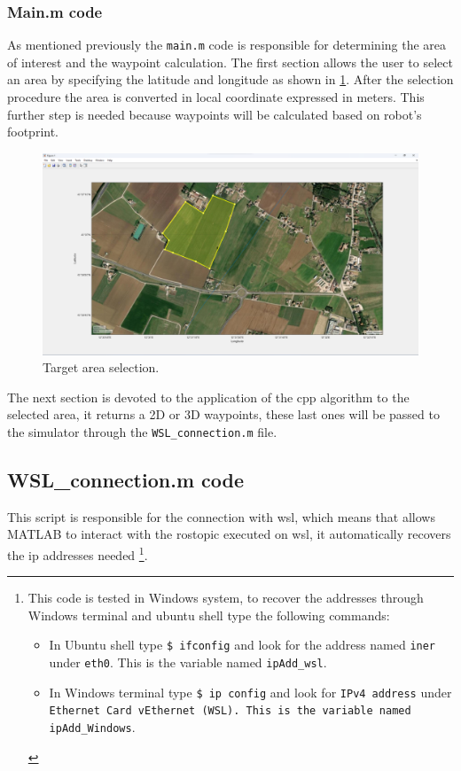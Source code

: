 \subsubsection*{Main.m code}
As mentioned previously the \texttt{main.m} code is responsible for determining the area of interest and the waypoint calculation.
The first section allows the user to select an area by specifying the latitude and longitude as shown in \ref{fig:target_area_selection}. After the selection procedure the area is converted in local coordinate expressed in meters. This further step is needed because waypoints will be calculated based on robot's footprint.

\begin{figure}[hbt!]
	\centering
	\includegraphics[width=\linewidth]{images/target_area_selection}
	\caption{Target area selection.}
	\label{fig:target_area_selection}
\end{figure}

The next section is devoted to the application of the \ac{cpp} algorithm to the selected area, it returns a 2D or 3D waypoints, these last ones will be passed to the simulator through the \texttt{WSL\_connection.m} file.


\subsection*{WSL\_connection.m code}
This script is responsible for the connection with \ac{wsl}, which means that allows MATLAB to interact with the rostopic executed on \ac{wsl}, it automatically recovers the ip addresses needed
\footnote{This code is tested in Windows system, to recover the addresses through Windows terminal and ubuntu shell type the following commands: 
\begin{itemize}
	\item In Ubuntu shell type \texttt{\$ ifconfig} and look for the address named \texttt{iner} under \texttt{eth0}. This is the variable named \texttt{ipAdd\_wsl}.
	\item In Windows terminal type \texttt{\$ ip config} and look for \texttt{IPv4 address} under \texttt{Ethernet Card vEthernet (WSL). This is the variable named \texttt{ipAdd\_Windows}}.
\end{itemize}}.


